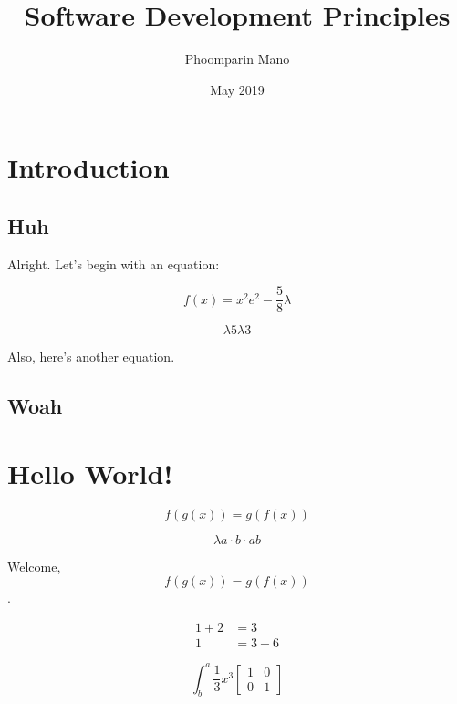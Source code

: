 \documentclass[11pt]{article}
\title{Software Development Principles}
\author{Phoomparin Mano}
\date{May 2019}
\begin{document}
  \maketitle

  \section{Introduction}

  \subsection{Huh}

  Alright. Let's begin with an equation:

  \begin{equation}
    f(x) = x^2 e ^2 - \frac{5}{8} \lambda
  \end{equation}
  
  \begin{equation*}
  	\lambda 5 \lambda 3
  \end{equation*}

  Also, here's another equation.

  \subsection{Woah}

  \section{Hello World!}

  \begin{equation}
    f(g(x)) = g(f(x))
  \end{equation}

  \begin{equation*}
    \lambda a \cdot b \cdot ab
  \end{equation*}

  Welcome, \[f(g(x)) = g(f(x))\].

  \begin{align*}
    1 + 2 &= 3 \\
    1 &= 3 - 6
  \end{align*}

  \begin{equation*}
    \int^a_b \frac{1}{3} x^3

    \left[
      \begin{matrix}
        1 & 0\\
        0 & 1
      \end{matrix}
    \right]
  \end{equation*}
\end{document}
